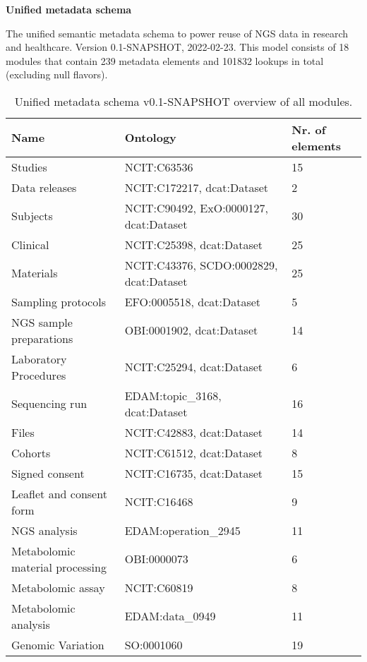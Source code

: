 \documentclass{article}
\begin{document}
\setlength\parindent{0pt}

\textbf{Unified metadata schema}
\newline

The unified semantic metadata schema to power reuse of NGS data in research and healthcare. Version 0.1-SNAPSHOT, 2022-02-23. This model consists of 18 modules that contain 239 metadata elements and 101832 lookups in total (excluding null flavors).

\begin{table}[htb]
\begin{tabular}{lll}
Name & Ontology & Nr. of elements \\
\hline
Studies & NCIT:C63536  & 15 \\
Data releases & NCIT:C172217, dcat:Dataset  & 2 \\
Subjects & NCIT:C90492, ExO:0000127, dcat:Dataset  & 30 \\
Clinical & NCIT:C25398, dcat:Dataset  & 25 \\
Materials & NCIT:C43376, SCDO:0002829, dcat:Dataset  & 25 \\
Sampling protocols & EFO:0005518, dcat:Dataset  & 5 \\
NGS sample preparations & OBI:0001902, dcat:Dataset  & 14 \\
Laboratory Procedures & NCIT:C25294, dcat:Dataset  & 6 \\
Sequencing run & EDAM:topic\_3168, dcat:Dataset  & 16 \\
Files & NCIT:C42883, dcat:Dataset  & 14 \\
Cohorts & NCIT:C61512, dcat:Dataset  & 8 \\
Signed consent & NCIT:C16735, dcat:Dataset  & 15 \\
Leaflet and consent form & NCIT:C16468  & 9 \\
NGS analysis & EDAM:operation\_2945  & 11 \\
Metabolomic material processing & OBI:0000073  & 6 \\
Metabolomic assay & NCIT:C60819  & 8 \\
Metabolomic analysis & EDAM:data\_0949  & 11 \\
Genomic Variation & SO:0001060  & 19 \\
\hline
\end{tabular}
\caption[Module overview]{\label{table:table1} Unified metadata schema v0.1-SNAPSHOT overview of all modules.}
\end{table}
\end{document}
